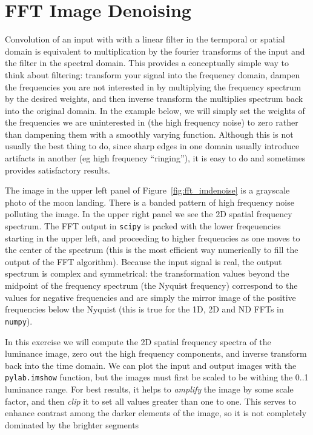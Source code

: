 \section{FFT Image Denoising}
\label{sec:fft_imdenoise}

Convolution of an input with with a linear filter in the termporal or
spatial domain is equivalent to multiplication by the fourier
transforms of the input and the filter in the spectral domain.  This
provides a conceptually simple way to think about filtering: transform
your signal into the frequency domain, dampen the frequencies you are
not interested in by multiplying the frequency spectrum by the desired
weights, and then inverse transform the multiplies spectrum back into
the original domain.  In the example below, we will simply set the
weights of the frequencies we are uninterested in (the high frequency
noise) to zero rather than dampening them with a smoothly varying
function.  Although this is not usually the best thing to do, since
sharp edges in one domain usually introduce artifacts in another (eg
high frequency ``ringing''), it is easy to do and sometimes provides
satisfactory results.

The image in the upper left panel of Figure~\ref{fig:fft_imdenoise} is
a grayscale photo of the moon landing.  There is a banded pattern of
high frequency noise polluting the image.  In the upper right panel we
see the 2D spatial frequency spectrum.  The FFT output in
\texttt{scipy} is packed with the lower freqeuencies starting in the
upper left, and proceeding to higher frequencies as one moves to the
center of the spectrum (this is the most efficient way numerically to
fill the output of the FFT algorithm).  Because the input signal is
real, the output spectrum is complex and symmetrical: the
transformation values beyond the midpoint of the frequency spectrum
(the Nyquist frequency) correspond to the values for negative
frequencies and are simply the mirror image of the positive
frequencies below the Nyquist (this is true for the 1D, 2D and ND FFTs
in \texttt{numpy}).

In this exercise we will compute the 2D spatial frequency spectra of
the luminance image, zero out the high frequency components, and
inverse transform back into the time domain.  We can plot the input
and output images with the \texttt{pylab.imshow} function, but the
images must first be scaled to be withing the 0..1 luminance range.
For best results, it helps to \textit{amplify} the image by some scale
factor, and then \textit{clip} it to set all values greater than one
to one.  This serves to enhance contrast among the darker elements of
the image, so it is not completely dominated by the brighter segments

